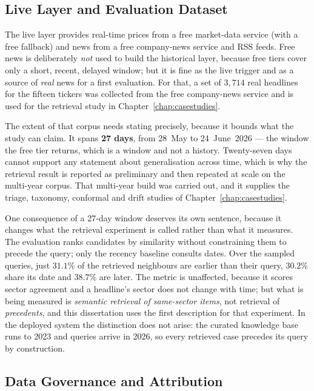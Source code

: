 \subsection{Live Layer and Evaluation Dataset}
\label{sec:met_data_live}

The live layer provides real-time prices from a free market-data service (with a free fallback) and news
from a free company-news service and RSS feeds. Free news is deliberately \emph{not} used to build the
historical layer, because free tiers cover only a short, recent, delayed window; but it is fine as the live
trigger and as a source of \emph{real} news for a first evaluation. For that, a set of $3{,}714$ real
headlines for the fifteen tickers was collected from the free company-news service and is used for the
retrieval study in Chapter~\ref{chap:casestudies}.

The extent of that corpus needs stating precisely, because it bounds what the study can claim. It spans
\textbf{27 days}, from 28~May to 24~June~2026 --- the window the free tier returns, which is a window and
not a history. Twenty-seven days cannot support any statement about generalisation across time, which is
why the retrieval result is reported as preliminary and then repeated at scale on the multi-year corpus.
That multi-year build was carried out, and it supplies the triage, taxonomy, conformal and drift
studies of Chapter~\ref{chap:casestudies}.

One consequence of a 27-day window deserves its own sentence, because it changes what the retrieval
experiment is called rather than what it measures. The evaluation ranks candidates by similarity without
constraining them to precede the query; only the recency baseline consults dates. Over the sampled
queries, just $31.1\%$ of the retrieved neighbours are earlier than their query, $30.2\%$ share its date
and $38.7\%$ are later. The metric is unaffected, because it scores sector agreement and a headline's
sector does not change with time; but what is being measured is \emph{semantic retrieval of same-sector
items}, not retrieval of \emph{precedents}, and this dissertation uses the first description for that
experiment. In the deployed system the distinction does not arise: the curated knowledge base runs to
2023 and queries arrive in 2026, so every retrieved case precedes its query by construction.

\subsection{Data Governance and Attribution}
\label{sec:met_data_gov}

